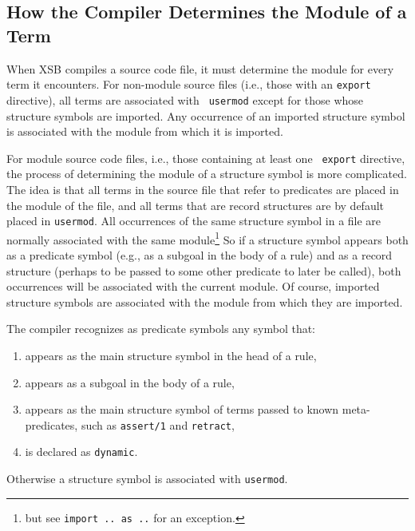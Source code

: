 \subsection{How the Compiler Determines the Module of a Term}

When XSB compiles a source code file, it must determine the module for
every term it encounters.  For non-module source files (i.e., those
with an {\tt export} directive), all terms are associated with {\tt
  usermod} except for those whose structure symbols are imported.  Any
occurrence of an imported structure symbol is associated with the
module from which it is imported.

For module source code files, i.e., those containing at least one {\tt
  export} directive, the process of determining the module of a
structure symbol is more complicated.  The idea is that all terms in
the source file that refer to predicates are placed in the module of
the file, and all terms that are record structures are by default
placed in {\tt usermod}.  All occurrences of the same structure symbol
in a file are normally associated with the same module\footnote{but
  see {\tt import .. as ..} for an exception.}  So if a structure
symbol appears both as a predicate symbol (e.g., as a subgoal in the
body of a rule) and as a record structure (perhaps to be passed to
some other predicate to later be called), both occurrences will be
associated with the current module.  Of course, imported structure
symbols are associated with the module from which they are imported.

The compiler recognizes as predicate symbols any symbol that:
\begin{enumerate}
\item appears as the main structure symbol in the head of a rule,

\item appears as a subgoal in the body of a rule,

\item appears as the main structure symbol of terms passed to known
  meta-predicates, such as {\tt assert/1} and {\tt retract},

\item is declared as {\tt dynamic}.
\end{enumerate}

Otherwise a structure symbol is associated with {\tt usermod}.

